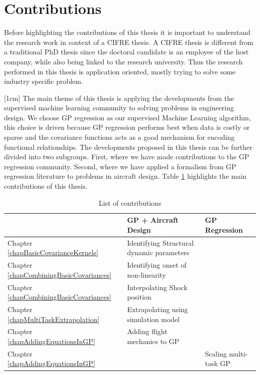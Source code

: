 \section{Contributions}\label{secCh1Contributions}
Before highlighting the contributions of this thesis it is important to understand the research work in context of a CIFRE thesis. A CIFRE thesis is different from a traditional PhD thesis since the doctoral candidate is an employee of the host company, while also being linked to the research university. Thus the research performed in this thesis is application oriented, mostly trying to solve some industry specific problem.

[1cm]
The main theme of this thesis is applying the developments from the supervised machine learning community to solving problems in engineering design. We choose GP regression as our supervised Machine Learning algorithm, this choice is driven because GP regression performs best when data is costly or sparse and the covariance functions acts as a good mechanism for encoding functional relationships. The developments proposed in this thesis can be further divided into two subgroups. First, where we have made contributions to the GP regression community. Second, where we have applied a formalism from GP regression literature to problems in aircraft design. Table \ref{tabListOfContributions} highlights the main contributions of this thesis.

\begin{table}[!ht]
\centering
\begin{tabularx}{\textwidth}{|l|X|X|}
  \hline
  & GP + Aircraft Design & GP Regression \\
  \hline 
  \hline
Chapter \ref{chapBasicCovarianceKernels}& Identifying Structural dynamic parameters \cite{chiplunkar2017operational} &\\
\hline
Chapter \ref{chapCombiningBasicCovariances} & Identifying onset of non-linearity \cite{chiplunkar:hal-01555401} &\\
\hline
Chapter \ref{chapCombiningBasicCovariances} & Interpolating Shock position \cite{oatao18004} &\\
\hline
Chapter \ref{chapMultiTaskExtrapolation} & Extrapolating using simulation model &\\
\hline
Chapter \ref{chapAddingEquationsInGP} & Adding flight mechanics to GP \cite{oatao18001} &\\
\hline
Chapter \ref{chapAddingEquationsInGP} & & Scaling multi-task GP  \cite{icpram16Ankit, oatao18000}  \\
  \hline 
  \end{tabularx}
  \label{tabListOfContributions}
  \caption{List of contributions}
  \end{table}

